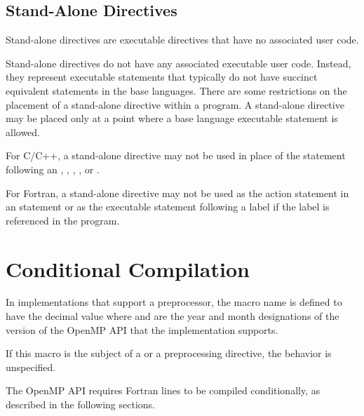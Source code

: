 \subsection{Stand-Alone Directives}
\label{subsec:Stand-Alone Directives}
\summary
Stand-alone directives are executable directives that have no associated user code.

\descr
Stand-alone directives do not have any associated executable user code. Instead, they 
represent executable statements that typically do not have succinct equivalent statements 
in the base languages. There are some restrictions on the placement of a stand-alone 
directive within a program. A stand-alone directive may be placed only at a point where 
a base language executable statement is allowed.

\restrictions
\ccppspecificstart
For C/C++, a stand-alone directive may not be used in place of the statement following 
an , , , , or . 
\ccppspecificend

\fortranspecificstart
For Fortran, a stand-alone directive may not be used as the action statement in an  
statement or as the executable statement following a label if the label is referenced in 
the program.
\fortranspecificend









\section{Conditional Compilation}
\label{sec:Conditional Compilation}
In implementations that support a preprocessor, the  macro name is defined to 
have the decimal value  where  and  are the year and month designations 
of the version of the OpenMP API that the implementation supports. 

If this macro is the subject of a  or a  preprocessing directive, the 
behavior is unspecified.

\fortranspecificstart
The OpenMP API requires Fortran lines to be compiled conditionally, as described in 
the following sections.








